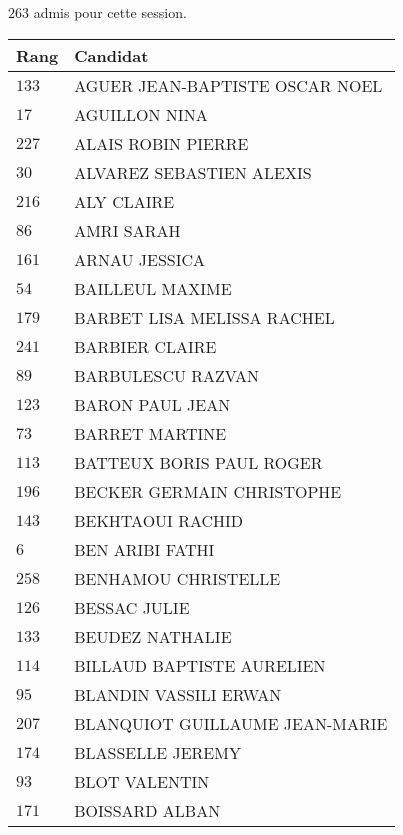




  $263$ admis pour cette session.

  \begin{xltabular}{\linewidth}{|l|X|}
    \hline
    \textbf{Rang} & \textbf{Candidat} \\
    \hline
    $133$ & AGUER JEAN-BAPTISTE OSCAR NOEL \\
    \hline
    $17$ & AGUILLON NINA \\
    \hline
    $227$ & ALAIS ROBIN PIERRE \\
    \hline
    $30$ & ALVAREZ SEBASTIEN ALEXIS \\
    \hline
    $216$ & ALY CLAIRE \\
    \hline
    $86$ & AMRI SARAH \\
    \hline
    $161$ & ARNAU JESSICA \\
    \hline
    $54$ & BAILLEUL MAXIME \\
    \hline
    $179$ & BARBET LISA MELISSA RACHEL \\
    \hline
    $241$ & BARBIER CLAIRE \\
    \hline
    $89$ & BARBULESCU RAZVAN \\
    \hline
    $123$ & BARON PAUL JEAN \\
    \hline
    $73$ & BARRET MARTINE \\
    \hline
    $113$ & BATTEUX BORIS PAUL ROGER \\
    \hline
    $196$ & BECKER GERMAIN CHRISTOPHE \\
    \hline
    $143$ & BEKHTAOUI RACHID \\
    \hline
    $6$ & BEN ARIBI FATHI \\
    \hline
    $258$ & BENHAMOU CHRISTELLE \\
    \hline
    $126$ & BESSAC JULIE \\
    \hline
    $133$ & BEUDEZ NATHALIE \\
    \hline
    $114$ & BILLAUD BAPTISTE AURELIEN \\
    \hline
    $95$ & BLANDIN VASSILI ERWAN \\
    \hline
    $207$ & BLANQUIOT GUILLAUME JEAN-MARIE \\
    \hline
    $174$ & BLASSELLE JEREMY \\
    \hline
    $93$ & BLOT VALENTIN \\
    \hline
    $171$ & BOISSARD ALBAN \\
    \hline

\end{xltabular}

